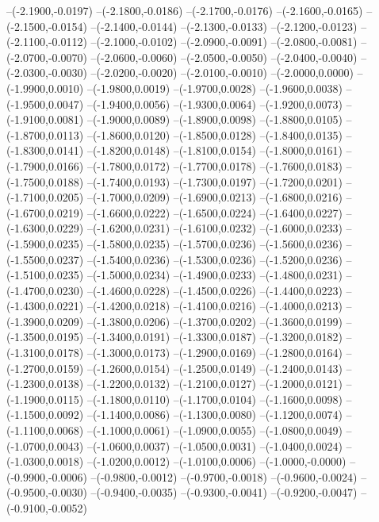 	--(-2.1900,-0.0197)
	--(-2.1800,-0.0186)
	--(-2.1700,-0.0176)
	--(-2.1600,-0.0165)
	--(-2.1500,-0.0154)
	--(-2.1400,-0.0144)
	--(-2.1300,-0.0133)
	--(-2.1200,-0.0123)
	--(-2.1100,-0.0112)
	--(-2.1000,-0.0102)
	--(-2.0900,-0.0091)
	--(-2.0800,-0.0081)
	--(-2.0700,-0.0070)
	--(-2.0600,-0.0060)
	--(-2.0500,-0.0050)
	--(-2.0400,-0.0040)
	--(-2.0300,-0.0030)
	--(-2.0200,-0.0020)
	--(-2.0100,-0.0010)
	--(-2.0000,0.0000)
	--(-1.9900,0.0010)
	--(-1.9800,0.0019)
	--(-1.9700,0.0028)
	--(-1.9600,0.0038)
	--(-1.9500,0.0047)
	--(-1.9400,0.0056)
	--(-1.9300,0.0064)
	--(-1.9200,0.0073)
	--(-1.9100,0.0081)
	--(-1.9000,0.0089)
	--(-1.8900,0.0098)
	--(-1.8800,0.0105)
	--(-1.8700,0.0113)
	--(-1.8600,0.0120)
	--(-1.8500,0.0128)
	--(-1.8400,0.0135)
	--(-1.8300,0.0141)
	--(-1.8200,0.0148)
	--(-1.8100,0.0154)
	--(-1.8000,0.0161)
	--(-1.7900,0.0166)
	--(-1.7800,0.0172)
	--(-1.7700,0.0178)
	--(-1.7600,0.0183)
	--(-1.7500,0.0188)
	--(-1.7400,0.0193)
	--(-1.7300,0.0197)
	--(-1.7200,0.0201)
	--(-1.7100,0.0205)
	--(-1.7000,0.0209)
	--(-1.6900,0.0213)
	--(-1.6800,0.0216)
	--(-1.6700,0.0219)
	--(-1.6600,0.0222)
	--(-1.6500,0.0224)
	--(-1.6400,0.0227)
	--(-1.6300,0.0229)
	--(-1.6200,0.0231)
	--(-1.6100,0.0232)
	--(-1.6000,0.0233)
	--(-1.5900,0.0235)
	--(-1.5800,0.0235)
	--(-1.5700,0.0236)
	--(-1.5600,0.0236)
	--(-1.5500,0.0237)
	--(-1.5400,0.0236)
	--(-1.5300,0.0236)
	--(-1.5200,0.0236)
	--(-1.5100,0.0235)
	--(-1.5000,0.0234)
	--(-1.4900,0.0233)
	--(-1.4800,0.0231)
	--(-1.4700,0.0230)
	--(-1.4600,0.0228)
	--(-1.4500,0.0226)
	--(-1.4400,0.0223)
	--(-1.4300,0.0221)
	--(-1.4200,0.0218)
	--(-1.4100,0.0216)
	--(-1.4000,0.0213)
	--(-1.3900,0.0209)
	--(-1.3800,0.0206)
	--(-1.3700,0.0202)
	--(-1.3600,0.0199)
	--(-1.3500,0.0195)
	--(-1.3400,0.0191)
	--(-1.3300,0.0187)
	--(-1.3200,0.0182)
	--(-1.3100,0.0178)
	--(-1.3000,0.0173)
	--(-1.2900,0.0169)
	--(-1.2800,0.0164)
	--(-1.2700,0.0159)
	--(-1.2600,0.0154)
	--(-1.2500,0.0149)
	--(-1.2400,0.0143)
	--(-1.2300,0.0138)
	--(-1.2200,0.0132)
	--(-1.2100,0.0127)
	--(-1.2000,0.0121)
	--(-1.1900,0.0115)
	--(-1.1800,0.0110)
	--(-1.1700,0.0104)
	--(-1.1600,0.0098)
	--(-1.1500,0.0092)
	--(-1.1400,0.0086)
	--(-1.1300,0.0080)
	--(-1.1200,0.0074)
	--(-1.1100,0.0068)
	--(-1.1000,0.0061)
	--(-1.0900,0.0055)
	--(-1.0800,0.0049)
	--(-1.0700,0.0043)
	--(-1.0600,0.0037)
	--(-1.0500,0.0031)
	--(-1.0400,0.0024)
	--(-1.0300,0.0018)
	--(-1.0200,0.0012)
	--(-1.0100,0.0006)
	--(-1.0000,-0.0000)
	--(-0.9900,-0.0006)
	--(-0.9800,-0.0012)
	--(-0.9700,-0.0018)
	--(-0.9600,-0.0024)
	--(-0.9500,-0.0030)
	--(-0.9400,-0.0035)
	--(-0.9300,-0.0041)
	--(-0.9200,-0.0047)
	--(-0.9100,-0.0052)

